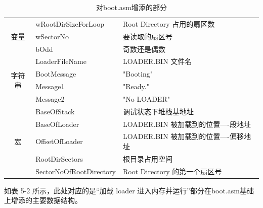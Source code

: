 \begin{table}[H]
\begin{center}
\caption{对boot.asm增添的部分}
\begin{tabular}{|cl|l|l|}
\hline
\multicolumn{2}{|c|}{\multirow{3}{*}{变量}}  & wRootDirSizeForLoop     & Root Directory 占用的扇区数      \\ \cline{3-4} 
\multicolumn{2}{|c|}{}                     & wSectorNo               & 要读取的扇区号                    \\ \cline{3-4} 
\multicolumn{2}{|c|}{}                     & bOdd                    & 奇数还是偶数                     \\ \hline
\multicolumn{2}{|c|}{\multirow{4}{*}{字符串}} & LoaderFileName          & LOADER.BIN 文件名             \\ \cline{3-4} 
\multicolumn{2}{|c|}{}                     & BootMessage             & "Booting"                  \\ \cline{3-4} 
\multicolumn{2}{|c|}{}                     & Message1                & "Ready."                   \\ \cline{3-4} 
\multicolumn{2}{|c|}{}                     & Message2                & "No LOADER"                \\ \hline
\multicolumn{2}{|c|}{\multirow{5}{*}{宏}}   & BaseOfStack             & 调试状态下堆栈基地址                 \\ \cline{3-4} 
\multicolumn{2}{|c|}{}                     & BaseOfLoader            & LOADER.BIN 被加载到的位置----段地址  \\ \cline{3-4} 
\multicolumn{2}{|c|}{}                     & OffsetOfLoader          & LOADER.BIN 被加载到的位置----偏移地址 \\ \cline{3-4} 
\multicolumn{2}{|c|}{}                     & RootDirSectors          & 根目录占用空间                    \\ \cline{3-4} 
\multicolumn{2}{|c|}{}                     & SectorNoOfRootDirectory & Root Directory 的第一个扇区号     \\ \hline
\end{tabular}
\end{center}
\end{table}
如表 5-2 所示，此处对应的是“加载 loader 进入内存并运行”部分在boot.asm基础上增添的主要数据结构。

